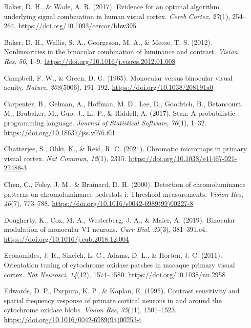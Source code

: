 \documentclass[
  letterpaper,
  DIV=11,
  numbers=noendperiod]{scrartcl}
\newlength{\cslhangindent}
\newlength{\cslentryspacingunit} %
\newenvironment{CSLReferences}[2] %
 {%
  \setlength{\parindent}{0pt}
  \ifodd #1
  \let\oldpar\par
  \def\par{\hangindent=\cslhangindent\oldpar}
  \fi
  \setlength{\parskip}{#2\cslentryspacingunit}
 }%
 {}
\begin{document}
\begin{CSLReferences}{1}{0}
\leavevmode{}%
Baker, D. H., \& Wade, A. R. (2017). Evidence for an optimal algorithm
underlying signal combination in human visual cortex. \emph{Cereb
Cortex}, \emph{27}(1), 254--264.
\url{https://doi.org/10.1093/cercor/bhw395}

\leavevmode{}%
Baker, D. H., Wallis, S. A., Georgeson, M. A., \& Meese, T. S. (2012).
Nonlinearities in the binocular combination of luminance and contrast.
\emph{Vision Res}, \emph{56}, 1--9.
\url{https://doi.org/10.1016/j.visres.2012.01.008}

\leavevmode{}%
Campbell, F. W., \& Green, D. G. (1965). Monocular versus binocular
visual acuity. \emph{Nature}, \emph{208}(5006), 191--192.
\url{https://doi.org/10.1038/208191a0}

\leavevmode{}%
Carpenter, B., Gelman, A., Hoffman, M. D., Lee, D., Goodrich, B.,
Betancourt, M., Brubaker, M., Guo, J., Li, P., \& Riddell, A. (2017).
Stan: A probabilistic programming language. \emph{Journal of Statistical
Software}, \emph{76}(1), 1--32.
\url{https://doi.org/10.18637/jss.v076.i01}

\leavevmode{}%
Chatterjee, S., Ohki, K., \& Reid, R. C. (2021). Chromatic micromaps in
primary visual cortex. \emph{Nat Commun}, \emph{12}(1), 2315.
\url{https://doi.org/10.1038/s41467-021-22488-3}

\leavevmode{}%
Chen, C., Foley, J. M., \& Brainard, D. H. (2000). Detection of
chromoluminance patterns on chromoluminance pedestals i: Threshold
measurements. \emph{Vision Res}, \emph{40}(7), 773--788.
\url{https://doi.org/10.1016/s0042-6989(99)00227-8}

\leavevmode{}%
Dougherty, K., Cox, M. A., Westerberg, J. A., \& Maier, A. (2019).
Binocular modulation of monocular V1 neurons. \emph{Curr Biol},
\emph{29}(3), 381--391.e4.
\url{https://doi.org/10.1016/j.cub.2018.12.004}

\leavevmode{}%
Economides, J. R., Sincich, L. C., Adams, D. L., \& Horton, J. C.
(2011). Orientation tuning of cytochrome oxidase patches in macaque
primary visual cortex. \emph{Nat Neurosci}, \emph{14}(12), 1574--1580.
\url{https://doi.org/10.1038/nn.2958}

\leavevmode{}%
Edwards, D. P., Purpura, K. P., \& Kaplan, E. (1995). Contrast
sensitivity and spatial frequency response of primate cortical neurons
in and around the cytochrome oxidase blobs. \emph{Vision Res},
\emph{35}(11), 1501--1523.
\url{https://doi.org/10.1016/0042-6989(94)00253-i}


\end{CSLReferences}
\end{document}
